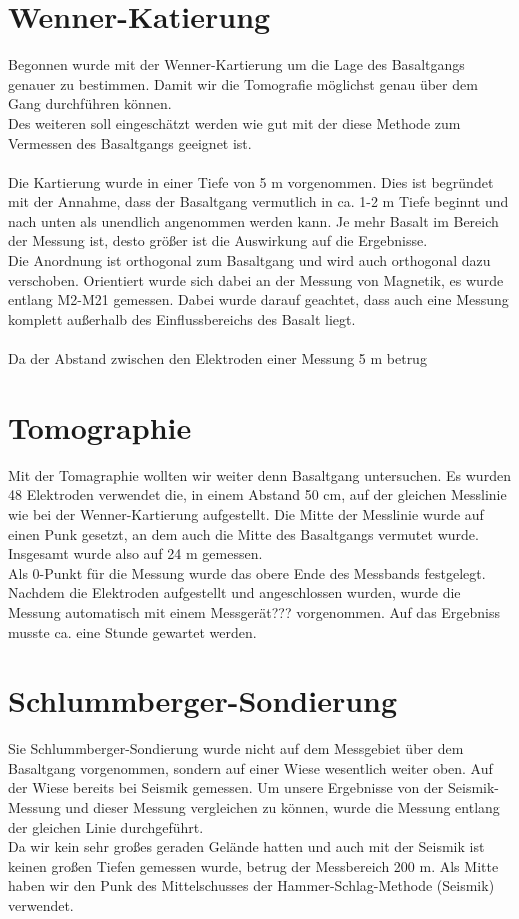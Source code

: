

\section{Wenner-Katierung}
Begonnen wurde mit der Wenner-Kartierung um die Lage des Basaltgangs genauer zu bestimmen. Damit wir die Tomografie möglichst genau über dem Gang durchführen
können. \\
Des weiteren soll eingeschätzt werden wie gut mit der diese Methode zum Vermessen des Basaltgangs geeignet ist.\\
\\
Die Kartierung wurde in einer Tiefe von 5 m vorgenommen. Dies ist begründet mit der Annahme, dass der Basaltgang vermutlich in ca. 1-2 m Tiefe beginnt und nach unten 
als unendlich angenommen werden kann. Je mehr Basalt im Bereich der Messung ist, desto größer ist die Auswirkung auf die Ergebnisse.\\
Die Anordnung ist orthogonal zum Basaltgang und wird auch orthogonal dazu verschoben. Orientiert wurde sich dabei an der Messung von Magnetik, es wurde 
entlang M2-M21 gemessen. Dabei wurde darauf geachtet, dass auch eine Messung komplett außerhalb 
des Einflussbereichs des Basalt liegt.\\
\\
Da der Abstand zwischen den Elektroden einer Messung 5 m betrug 

\section{Tomographie}
Mit der Tomagraphie wollten wir weiter denn Basaltgang untersuchen.
Es wurden 48 Elektroden verwendet die, in einem Abstand 50 cm, auf der gleichen Messlinie wie bei der Wenner-Kartierung aufgestellt. 
Die Mitte der Messlinie wurde auf einen Punk gesetzt, an dem auch die Mitte des Basaltgangs vermutet wurde. Insgesamt wurde also auf 24 m gemessen.\\
Als 0-Punkt für die Messung wurde das obere Ende des Messbands festgelegt.
Nachdem die Elektroden aufgestellt und angeschlossen wurden, wurde die Messung automatisch mit einem Messgerät??? vorgenommen. Auf das Ergebniss musste ca. 
eine Stunde gewartet werden.

 
\section{Schlummberger-Sondierung}
Sie Schlummberger-Sondierung wurde nicht auf dem Messgebiet über dem Basaltgang vorgenommen, sondern auf einer Wiese wesentlich weiter oben. Auf der Wiese 
bereits bei Seismik gemessen. Um unsere Ergebnisse von der Seismik-Messung und dieser Messung vergleichen zu können, wurde die Messung entlang der gleichen
Linie durchgeführt. \\
Da wir kein sehr großes geraden Gelände hatten und auch mit der Seismik ist keinen großen Tiefen gemessen wurde, betrug der Messbereich 200 m. Als Mitte 
haben wir den Punk des Mittelschusses der Hammer-Schlag-Methode (Seismik) verwendet.

